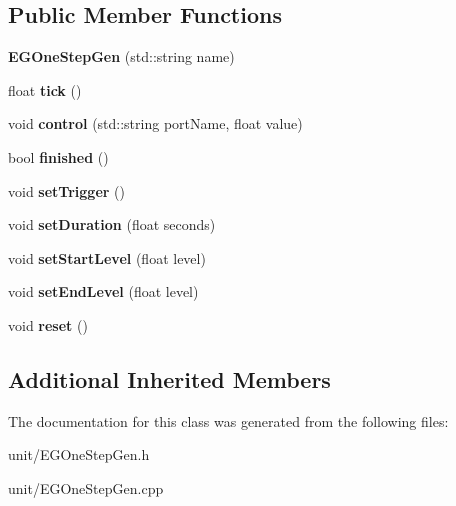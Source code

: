 \subsection*{Public Member Functions}
\begin{DoxyCompactItemize}
\item 
{\bfseries E\+G\+One\+Step\+Gen} (std\+::string name)\hypertarget{classunit_1_1EGOneStepGen_a9bc697acabed6c7b0467369ba073ede1}{}\label{classunit_1_1EGOneStepGen_a9bc697acabed6c7b0467369ba073ede1}

\item 
float {\bfseries tick} ()\hypertarget{classunit_1_1EGOneStepGen_a74df96649d7a66d19cb33bf9bf13f54a}{}\label{classunit_1_1EGOneStepGen_a74df96649d7a66d19cb33bf9bf13f54a}

\item 
void {\bfseries control} (std\+::string port\+Name, float value)\hypertarget{classunit_1_1EGOneStepGen_a8979594fb226c732a9b8232664f09047}{}\label{classunit_1_1EGOneStepGen_a8979594fb226c732a9b8232664f09047}

\item 
bool {\bfseries finished} ()\hypertarget{classunit_1_1EGOneStepGen_ae9f187e0f266559a80e4f4b534d79f78}{}\label{classunit_1_1EGOneStepGen_ae9f187e0f266559a80e4f4b534d79f78}

\item 
void {\bfseries set\+Trigger} ()\hypertarget{classunit_1_1EGOneStepGen_af94a0976e166a3f53b7bf14de58f81d6}{}\label{classunit_1_1EGOneStepGen_af94a0976e166a3f53b7bf14de58f81d6}

\item 
void {\bfseries set\+Duration} (float seconds)\hypertarget{classunit_1_1EGOneStepGen_aaf02138e168cad06cb955944f57ce93c}{}\label{classunit_1_1EGOneStepGen_aaf02138e168cad06cb955944f57ce93c}

\item 
void {\bfseries set\+Start\+Level} (float level)\hypertarget{classunit_1_1EGOneStepGen_af2b5bd8522fac9dc997d78d3750cdbbb}{}\label{classunit_1_1EGOneStepGen_af2b5bd8522fac9dc997d78d3750cdbbb}

\item 
void {\bfseries set\+End\+Level} (float level)\hypertarget{classunit_1_1EGOneStepGen_a3d58403aa5bebffeaf3f326855e0a233}{}\label{classunit_1_1EGOneStepGen_a3d58403aa5bebffeaf3f326855e0a233}

\item 
void {\bfseries reset} ()\hypertarget{classunit_1_1EGOneStepGen_a4898b08a0687e03802abdb7945708cab}{}\label{classunit_1_1EGOneStepGen_a4898b08a0687e03802abdb7945708cab}

\end{DoxyCompactItemize}
\subsection*{Additional Inherited Members}


The documentation for this class was generated from the following files\+:\begin{DoxyCompactItemize}
\item 
unit/E\+G\+One\+Step\+Gen.\+h\item 
unit/E\+G\+One\+Step\+Gen.\+cpp\end{DoxyCompactItemize}

